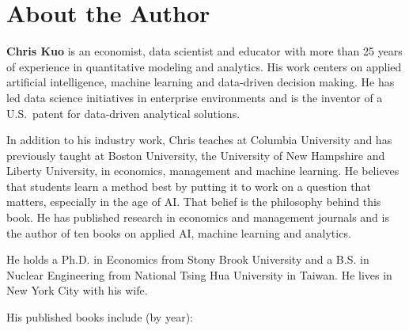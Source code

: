 \chapter*{About the Author}

\textbf{Chris Kuo} is an economist, data scientist and educator with more than 25 years of experience in quantitative modeling and analytics. 
His work centers on applied artificial intelligence, machine learning and data-driven decision making. He has led data science initiatives in enterprise environments
and is the inventor of a U.S.\ patent for data-driven analytical solutions.

In addition to his industry work, Chris teaches at Columbia University and has previously taught at Boston University, the University of New Hampshire and Liberty University, in economics, management and machine learning. He believes that students learn a method best by putting it to work on a question that matters, especially in the age of AI. That belief is the philosophy behind this book.
He has published research in economics and management journals and is the author of ten books on applied AI, machine learning and analytics.

He holds a Ph.D. in Economics from Stony Brook University and a B.S. in Nuclear Engineering from National Tsing Hua University in Taiwan. He lives in New York City with his wife.

\medskip
\noindent His published books include (by year):

